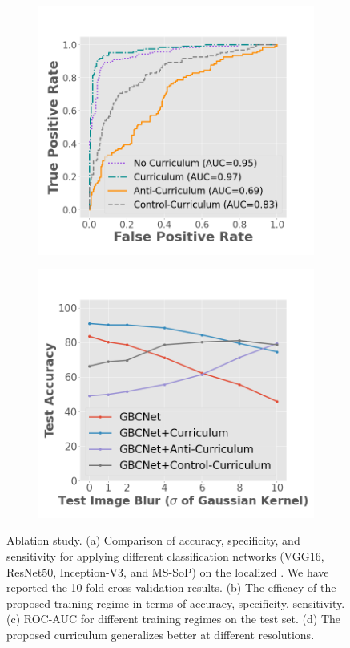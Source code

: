 \begin{figure}[t]
	\begin{subfigure}[b]{0.23\linewidth}
		\centering
		\includegraphics[width=\linewidth]{figs/gbcnet/roc.png}
		\caption{}
		\label{fig:ablation2}
	\end{subfigure}
		\begin{subfigure}[b]{0.23\linewidth}
		\centering
		\includegraphics[width=\linewidth]{figs/gbcnet/acc-mr.png}
		\caption{}
		\label{fig:ablation3}
	\end{subfigure}
	\caption[Ablation study]{Ablation study. (a) Comparison of accuracy, specificity, and sensitivity for applying different classification networks (VGG16, ResNet50, Inception-V3, and MS-SoP) on the localized \gb. We have reported the 10-fold cross validation results. (b) The efficacy of the proposed training regime in terms of accuracy, specificity, sensitivity. (c) ROC-AUC for different training regimes on the test set. (d) The proposed curriculum generalizes better at different resolutions. }
	\label{fig:diff_images}
\end{figure}

